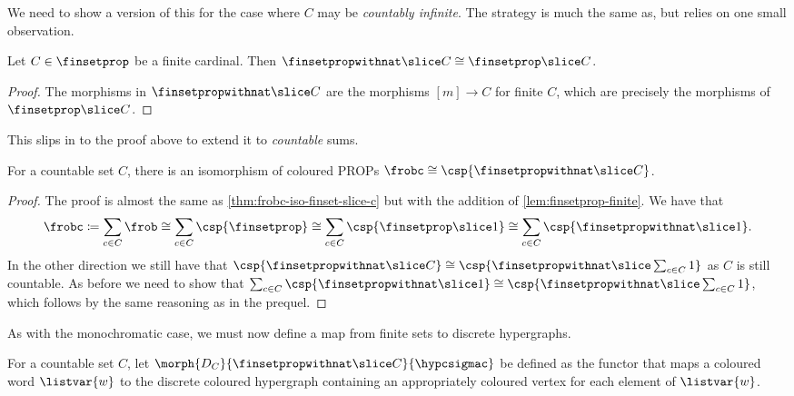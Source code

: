 We need to show a version of this for the case where \(C\) may be
\emph{countably infinite}.
The strategy is much the same as, but relies on one small observation.

\begin{lemma}
    \label{lem:finsetprop-finite}
    Let \(C \in \finsetprop\) be a finite cardinal.
    Then \(\finsetpropwithnat \slice C \cong \finsetprop \slice C\).
\end{lemma}
\begin{proof}
    The morphisms in \(\finsetpropwithnat \slice C\) are the morphisms
    \([m] \to C\) for finite \(C\), which are precisely the morphisms of
    \(\finsetprop \slice C\).
\end{proof}

This slips in to the proof above to extend it to \emph{countable} sums.

\begin{theorem}
    \label{thm:frobc-iso-hatfinset-slice-c}
    For a countable set \(C\), there is an isomorphism of coloured
    PROPs \(\frobc \cong \csp{\finsetpropwithnat \slice C}\).
\end{theorem}
\begin{proof}
    The proof is almost the same as \cref{thm:frobc-iso-finset-slice-c} but with
    the addition of \cref{lem:finsetprop-finite}.
    We have that \[
        \frobc
        \coloneqq
        \sum_{c \in C}\frob
        \cong
        \sum_{c \in C}\csp{\finsetprop}
        \cong
        \sum_{c \in C}\csp{\finsetprop \slice 1}
        \cong
        \sum_{c \in C}\csp{\finsetpropwithnat \slice 1}.
    \]
    In the other direction we still have that \(
    \csp{\finsetpropwithnat \slice C}
    \cong
    \csp{\finsetpropwithnat \slice \sum_{c \in C} 1}
    \) as \(C\) is still countable.
    As before we need to show that \(
    \sum_{c \in C}\csp{\finsetpropwithnat \slice 1}
    \cong
    \csp{\finsetpropwithnat \slice \sum_{c \in C} 1}
    \), which follows by the same reasoning as in the prequel.
\end{proof}

As with the monochromatic case, we must now define a map from finite sets to
discrete hypergraphs.

\begin{definition}
    For a countable set \(C\), let
    \(\morph{D_C}{\finsetpropwithnat \slice C}{\hypcsigmac}\) be
    defined as the functor that maps a coloured word \(\listvar{w}\) to the
    discrete coloured hypergraph containing an appropriately coloured vertex for
    each element of \(\listvar{w}\).
\end{definition}

